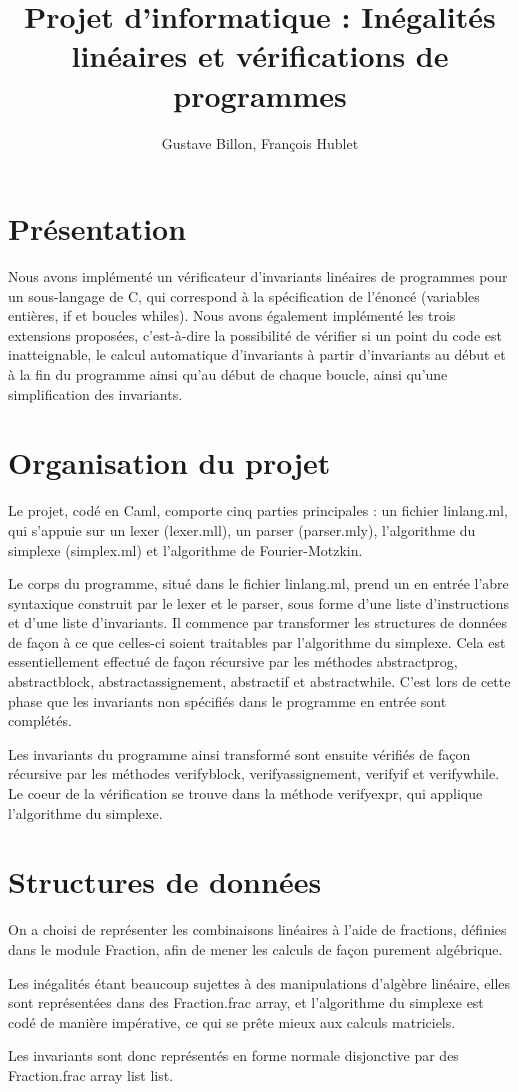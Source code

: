 \documentclass[a4paper]{article}
\title{Projet d'informatique : Inégalités linéaires et vérifications de programmes}
\author{Gustave Billon, François Hublet}
\begin{document}
\maketitle


\section{Présentation}

Nous avons implémenté un vérificateur d'invariants linéaires de programmes pour un sous-langage de C, qui correspond à la spécification de l'énoncé (variables entières, if et boucles whiles). Nous avons également implémenté les trois extensions proposées, c'est-à-dire la possibilité de vérifier si un point du code est inatteignable, le calcul automatique d'invariants à partir d'invariants au début et à la fin du programme ainsi qu'au début de chaque boucle, ainsi qu'une simplification des invariants.

\section{Organisation du projet}

Le projet, codé en Caml, comporte cinq parties principales : un fichier linlang.ml, qui s'appuie sur un lexer (lexer.mll), un parser (parser.mly), l'algorithme du simplexe (simplex.ml) et l'algorithme de Fourier-Motzkin.

Le corps du programme, situé dans le fichier linlang.ml, prend un en entrée l'abre syntaxique construit par le lexer et le parser, sous forme d'une liste d'instructions et d'une liste d'invariants. Il commence par transformer les structures de données de façon à ce que celles-ci soient traitables par l'algorithme du simplexe. Cela est essentiellement effectué de façon récursive par les méthodes abstract\textunderscore prog, abstract\textunderscore block, abstract\textunderscore assignement, abstract\textunderscore if et abstract\textunderscore while. C'est lors de cette phase que les invariants non spécifiés dans le programme en entrée sont complétés.

Les invariants du programme ainsi transformé sont ensuite vérifiés de façon récursive par les méthodes verify\textunderscore block, verify\textunderscore assignement, verify\textunderscore if et verify\textunderscore while. Le coeur de la vérification se trouve dans la méthode verify\textunderscore expr, qui applique l'algorithme du simplexe.

\section{Structures de données}

On a choisi de représenter les combinaisons linéaires à l'aide de fractions, définies dans le module Fraction, afin de mener les calculs de façon purement algébrique.

Les inégalités étant beaucoup sujettes à des manipulations d'algèbre linéaire, elles sont représentées dans des Fraction.frac array, et l'algorithme du simplexe est codé de manière impérative, ce qui se prête mieux aux calculs matriciels.

Les invariants sont donc représentés en forme normale disjonctive par des Fraction.frac array list list.
\end{document}
